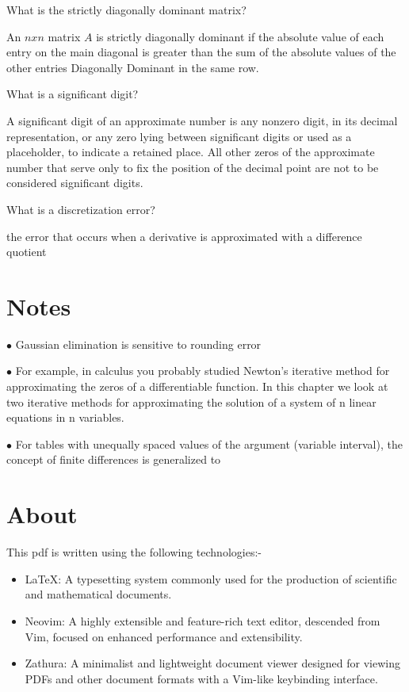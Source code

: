 \documentclass{exam}
\begin{document}
\begin{questions}
	\question What is the strictly diagonally dominant matrix?

	An $n x n$ matrix $A$ is strictly diagonally dominant if the absolute value of each entry on the main diagonal is greater than the sum of the absolute values of the other entries Diagonally Dominant in the same row.

	\question What is a significant digit?

	A significant digit of an approximate number is any nonzero digit, in its decimal representation, or any zero lying between significant digits or used as a placeholder, to indicate a retained place. All other zeros of the approximate number that serve only to fix the position of the decimal point are not to be considered significant digits.

	\question What is a discretization error?

	the error that occurs when a derivative is approximated with a difference quotient

	\section{Notes}
	$\bullet$ Gaussian elimination is sensitive to rounding error

	$\bullet$ For example, in calculus you probably studied Newton’s iterative method for approximating the zeros of a differentiable function. In this chapter we look at two iterative methods for approximating the solution of a system of n linear equations in n variables.

	$\bullet$ For tables with unequally spaced values of the argument (variable interval), the concept of finite differences is generalized to

	\section{About}

	This pdf is written using the following technologies:-
	\begin{itemize}
		\item LaTeX: A typesetting system commonly used for the production of scientific and mathematical documents.
		\item Neovim: A highly extensible and feature-rich text editor, descended from Vim, focused on enhanced performance and extensibility.
		\item Zathura: A minimalist and lightweight document viewer designed for viewing PDFs and other document formats with a Vim-like keybinding interface.
	\end{itemize}


\end{questions}
\end{document}
